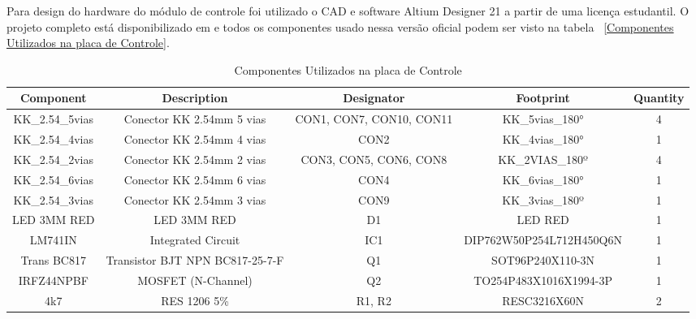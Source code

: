 \documentclass[../delivery_hospital_report.tex]{subfiles}
\begin{document}
Para design do hardware do módulo de controle foi utilizado o CAD e software Altium Designer 21 \cite{altium21} a partir de uma licença estudantil. O projeto completo está disponibilizado em \cite{github_modulos} e todos os componentes usado nessa versão oficial podem ser visto na tabela ~\ref{Componentes Utilizados na placa de Controle}.

\begin{table}[h]
\caption{Componentes Utilizados na placa de Controle}
\centering
\begin{adjustbox}{width=\columnwidth,center}
\begin{tabular}{|c|c|c|c|c|}
\hline
Component        & Description                                    & Designator                 & Footprint                & Quantity \\ \hline
KK\_2.54\_5vias  & Conector KK 2.54mm 5   vias                    & CON1, CON7, CON10,   CON11 & KK\_5vias\_180°          & 4        \\ \hline
KK\_2.54\_4vias  & Conector KK 2.54mm 4   vias                    & CON2                       & KK\_4vias\_180°          & 1        \\ \hline
KK\_2.54\_2vias  & Conector KK 2.54mm 2   vias                    & CON3, CON5, CON6,   CON8   & KK\_2VIAS\_180º          & 4        \\ \hline
KK\_2.54\_6vias  & Conector KK 2.54mm 6   vias                    & CON4                       & KK\_6vias\_180°          & 1        \\ \hline
KK\_2.54\_3vias  & Conector KK 2.54mm 3   vias                    & CON9                       & KK\_3vias\_180º          & 1        \\ \hline
LED 3MM RED      & LED 3MM RED                                    & D1                         & LED RED                  & 1        \\ \hline
LM741IN          & Integrated Circuit                             & IC1                        & DIP762W50P254L712H450Q6N & 1        \\ \hline
Trans BC817      & Transistor BJT NPN   BC817-25-7-F              & Q1                         & SOT96P240X110-3N         & 1        \\ \hline
IRFZ44NPBF       & MOSFET (N-Channel)                             & Q2                         & TO254P483X1016X1994-3P   & 1        \\ \hline
4k7              & RES 1206 5\%                                   & R1, R2                     & RESC3216X60N             & 2        \\ \hline

\end{tabular}
\end{adjustbox}
\end{table}
\end{document}

